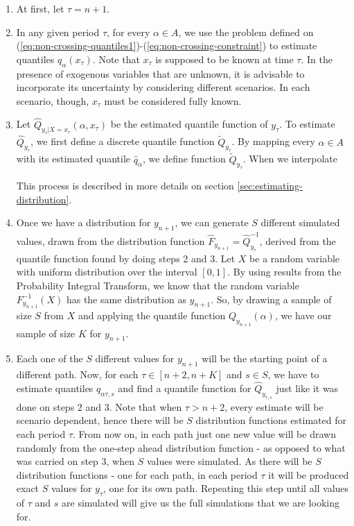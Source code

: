 \begin{enumerate}
	
\item At first, let $\tau = n + 1$.

\item In any given period $\tau$, for every $\alpha \in A$, we use the problem defined on  (\ref{eq:non-crossing-quantiles1})-(\ref{eq:non-crossing-constraint}) to estimate quantiles 
 $q_\alpha(x_{\tau})$.
Note that $x_{\tau}$ is supposed to be known at time $\tau$. In the presence of exogenous variables that are unknown, it is advisable to incorporate its uncertainty by considering different scenarios. In each scenario, though, $x_{\tau}$ must be considered fully known. 
 
\item Let $\hat{Q}_{y_{\tau}|X=x_\tau}(\alpha,x_\tau)$ be the estimated quantile function of ${y}_{\tau}$. 
To estimate $\hat{Q}_{y_{\tau}}$, we first define a discrete quantile function $\tilde{Q}_{y_\tau}$. By mapping every $\alpha \in A$ with its estimated quantile $\hat{q}_{\alpha}$, we define function $\tilde{Q}_{y_{\tau}}$. When we interpolate 

This process is described in more details on section \ref{sec:estimating-distribution}. 




\item Once we have a distribution for $y_{n+1}$, we can generate $S$ different simulated values, drawn from the distribution function $\hat{F}_{y_{n+1}} = \hat{Q}^{-1}_{y_{\tau}}$, derived from the quantile function found by doing steps 2 and 3. 
Let $X$ be a random variable with uniform distribution over the interval $[0,1]$. By using results from the Probability Integral Transform, we know that the random variable $F^{-1}_{y_{n+1}}(X)$ has the same distribution as $y_{n+1}$. So, by drawing a sample of size $S$ from $X$ and applying the quantile function $Q_{y_{n+1}}(\alpha)$, we have our sample of size $K$ for $y_{n+1}$.

\item Each one of the $S$ different values for $y_{n+1}$ will be the starting point of a different path. Now, for each $\tau \in [n+2,n+K]$ and $s \in S$, we have to estimate quantiles $q_{\alpha \tau, s}$ and find a quantile function for $\hat{Q}_{y_{\tau,s}}$ just like it was done on steps 2 and 3.
Note that when $\tau > n+2$, every estimate will be scenario dependent, hence there will be $S$ distribution functions estimated for each period $\tau$. From now on, in each path just one new value will be drawn randomly from the one-step ahead distribution function - as opposed to what was carried on step 3, when $S$ values were simulated. As there will be $S$ distribution functions - one for each path, in each period $\tau$ it will be produced exact $S$ values for $y_\tau$, one for its own path. Repeating this step until all values of $\tau$ and $s$ are simulated will give us the full simulations that we are looking for.
\end{enumerate}

